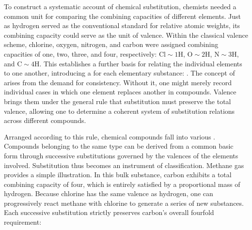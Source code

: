 \documentclass[submitted,12pt]{article}
\providecommand{\DIFaddbegin}{} %
\providecommand{\DIFaddend}{} %
\providecommand{\DIFdelbegin}{} %
\providecommand{\DIFdelend}{} %
\begin{document}
To construct a systematic account of chemical substitution, chemists needed a common unit for comparing the combining capacities of different elements. Just as hydrogen served as the conventional standard for relative atomic weights, its combining capacity could serve as the unit of valence. Within the classical valence scheme, chlorine, oxygen, nitrogen, and carbon were assigned combining capacities of one, two, three, and four, respectively: $\mathrm{Cl}\sim 1\mathrm{H}$, $\mathrm{O}\sim 2\mathrm{H}$, $\mathrm{N}\sim 3\mathrm{H}$, and $\mathrm{C}\sim 4\mathrm{H}$. This establishes a further basis for relating the individual elements to one another, introducing a  for each elementary substance: \DIFdelbegin %
\DIFdelend \DIFaddbegin {} \DIFaddend {}. The concept of  arises from the demand for consistency. Without it, one might merely record individual cases in which one element replaces another in compounds. Valence brings them under the general rule that substitution must preserve the total valence, allowing one to determine a coherent system of substitution relations across different compounds.

Arranged according to this rule, chemical compounds fall into various   . Compounds belonging to the same type can be derived from a common basic form through successive substitutions governed by the valences of the elements involved. Substitution thus becomes an instrument of classification. Methane gas provides a simple illustration. In this bulk substance, carbon exhibits a total combining capacity of four, which is entirely satisfied by a proportional mass of hydrogen. Because chlorine has the same valence as hydrogen, one can progressively react methane with chlorine to generate a series of new substances. Each successive substitution strictly preserves carbon's overall fourfold requirement: 
\end{document}
